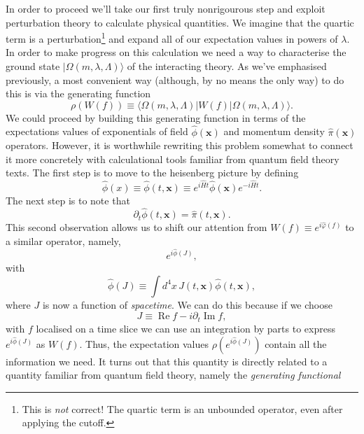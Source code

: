 \documentclass[11pt]{amsart}
\DeclareMathOperator{\im}{Im}
\DeclareMathOperator{\re}{Re}
\theoremstyle{plain}%
\theoremstyle{definition}
\theoremstyle{remark}
\begin{document}
In order to proceed we'll take our first truly nonrigourous step and exploit perturbation theory to calculate physical quantities. We imagine that the quartic term is a perturbation\footnote{This is \emph{not} correct! The quartic term is an unbounded operator, even after applying the cutoff.} and expand all of our expectation values in powers of $\lambda$. In order to make progress on this calculation we need a way to characterise the ground state $|\Omega(m,\lambda,\Lambda)\rangle$ of the interacting theory. As we've emphasised previously, a most convenient way (although, by no means the only way) to do this is via the generating function
\begin{equation}
	\rho(W(f)) \equiv \langle \Omega(m,\lambda,\Lambda)|W(f)|\Omega(m,\lambda,\Lambda)\rangle.
\end{equation}
We could proceed by building this generating function in terms of the expectations values of exponentials of field $\widehat{\phi}(\mathbf{x})$ and momentum density $\widehat{\pi}(\mathbf{x})$ operators. However, it is worthwhile rewriting this problem somewhat to connect it more concretely with calculational tools familiar from quantum field theory texts. The first step is to move to the heisenberg picture by defining
\begin{equation}
	\widehat{\phi}(x) \equiv \widehat{\phi}(t,\mathbf{x}) \equiv e^{i\widehat{H} t} \widehat{\phi}(\mathbf{x}) e^{-i\widehat{H} t}.
\end{equation}
The next step is to note that 
\begin{equation}
	\partial_t \widehat{\phi}(t,\mathbf{x}) = \widehat{\pi}(t,\mathbf{x}).
\end{equation}
This second observation allows us to shift our attention from $W(f) \equiv e^{i\widehat{\varphi}(f)}$ to a similar operator, namely,
\begin{equation}
	e^{i\widehat{\phi}(J)},
\end{equation}
with 
\begin{equation}
	\widehat{\phi}(J) \equiv \int d^4 x \, J(t,\mathbf{x})\widehat{\phi}(t,\mathbf{x}),
\end{equation}
where $J$ is now a function of \emph{spacetime}. We can do this because if we choose
\begin{equation}
	J \equiv \re f - i \partial_t \im f,
\end{equation} 
with $f$ localised on a time slice we can use an integration by parts to express $e^{i\widehat{\phi}(J)}$ as $W(f)$. Thus, the expectation values $\rho(e^{i\widehat{\phi}(J)})$ contain all the information we need. It turns out that this quantity is directly related to a quantity familiar from quantum field theory, namely the \emph{generating functional}
\end{document}
